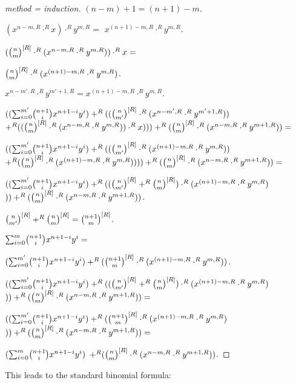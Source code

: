 \documentclass[english,11pt]{article}
\begin{document}
\begin{forthel}
\begin{proof}[method = induction]
$(n - m) + 1 = (n + 1) - m$.

$(x^{n - m,R} \cdot^{R} x) \cdot^{R} y^{m,R} =$
$x^{(n+1)-m,R} \cdot^{R} y^{m,R}$.

$(\cho{n}{m}^{[R]} \cdot^{R} (x^{n - m,R} \cdot^{R} y^{m,R})) \cdot^{R} x = $

$\cho{n}{m}^{[R]} \cdot^{R} (x^{(n+1) - m,R} \cdot^{R} y^{m,R})$.

$x^{n-m',R} \cdot^{R} y^{m'+1,R} = x^{(n+1)-m,R} \cdot^{R} y^{m,R}.$

$ ((\binsum{m'}{n+1}{x}{y}{R}) +^{R} ((\cho{n}{m'}^{[R]} \cdot^{R} (x^{n-m',R} \cdot^{R} y^{m'+1,R})) $
$ +^{R} 
((\cho{n}{m}^{[R]} \cdot^{R} (x^{n - m,R} \cdot^{R} y^{m,R})) \cdot^{R} x)))
   +^{R} (\cho{n}{m}^{[R]} \cdot^{R} (x^{n - m,R} \cdot^{R} y^{m+1,R})) = $

$ ((\binsum{m'}{n+1}{x}{y}{R}) +^{R} ((\cho{n}{m'}^{[R]} \cdot^{R} (x^{(n+1)-m,R} \cdot^{R} y^{m,R})) $
$ +^{R} 
(\cho{n}{m}^{[R]} \cdot^{R} (x^{(n+1) - m,R} \cdot^{R} y^{m,R}))))
   +^{R} (\cho{n}{m}^{[R]} \cdot^{R} (x^{n - m,R} \cdot^{R} y^{m+1,R})) =$

$ ((\binsum{m'}{n+1}{x}{y}{R}) +^{R} ((\cho{n}{m'}^{[R]} +^{R}  \cho{n}{m}^{[R]} )\cdot^{R} (x^{(n+1)-m,R} \cdot^{R} y^{m,R}) $
$  ))
   +^{R} (\cho{n}{m}^{[R]} \cdot^{R} (x^{n - m,R} \cdot^{R} y^{m+1,R})) $.

$\cho{n}{m'}^{[R]} +^{R}  \cho{n}{m}^{[R]} = \cho{n+1}{m}^{[R]}$.



$ \binsum{m}{n+1}{x}{y}{R} =$

$(\binsum{m'}{n+1}{x}{y}{R}) +^{R} (\cho{n+1}{m}^{[R]} \cdot^{R} (x^{(n+1)-m,R} \cdot^{R} y^{m,R}))$.



$ ((\binsum{m'}{n+1}{x}{y}{R}) +^{R} ((\cho{n}{m'}^{[R]} +^{R}  \cho{n}{m}^{[R]} )\cdot^{R} (x^{(n+1)-m,R} \cdot^{R} y^{m,R}) $
$  ))
   +^{R} (\cho{n}{m}^{[R]} \cdot^{R} (x^{n - m,R} \cdot^{R} y^{m+1,R})) =$


$ ((\binsum{m'}{n+1}{x}{y}{R}) +^{R} (\cho{n+1}{m}^{[R]} \cdot^{R} (x^{(n+1)-m,R} \cdot^{R} y^{m,R}) $
$  ))
   +^{R} (\cho{n}{m}^{[R]} \cdot^{R} (x^{n - m,R} \cdot^{R} y^{m+1,R})) =$

$ (\binsum{m}{n+1}{x}{y}{R}) $
$  +^{R} (\cho{n}{m}^{[R]} \cdot^{R} (x^{n - m,R} \cdot^{R} y^{m+1,R})) $.

\end{proof}
\end{forthel}
%
This leads to the standard binomial formula:
%
\end{document}

